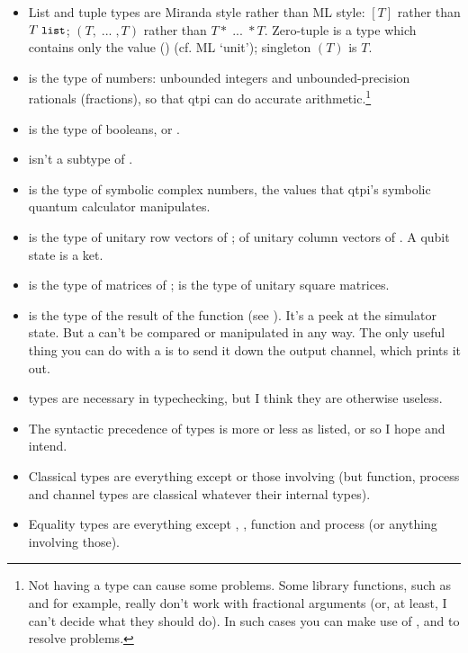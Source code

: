 \begin{itemize}
\item List and tuple types are Miranda style rather than ML style: $[T]$ rather than $T\;\texttt{\small{}list}$; $(T,\;...\;,T)$ rather than $T*\;...\;*T$. Zero-tuple is a type which contains only the value () (cf. ML `unit'); singleton $(T)$ is $T$.
\item {} is the type of numbers: unbounded integers and unbounded-precision rationals (fractions), so that qtpi can do accurate arithmetic.\footnote{Not having a type  can cause some problems. Some library functions, such as  and  for example, really don't work with fractional arguments (or, at least, I can't decide what they should do). In such cases you can make use of ,  and  to resolve problems.}
\item {} is the type of booleans,  or .
\item {} isn't a subtype of .
\item {} is the type of symbolic complex numbers, the values that qtpi's symbolic quantum calculator manipulates.
\item {} is the type of unitary row vectors of ;  of unitary column vectors of . A qubit state is a ket.
\item {}  is the type of matrices of ;  is the type of unitary square matrices.
\item {}  is the type of the result of the   function (see ). It's a peek at the simulator state. But a  can't be compared or manipulated in any way. The only useful thing you can do with a   is to send it down the  output channel, which prints it out.
\item {} types are necessary in typechecking, but I think they are otherwise useless.
\item The syntactic precedence of types is more or less as listed, or so I hope and intend. 
\item Classical types are everything except   or those involving   (but function, process and channel types are classical whatever their internal types).  
\item Equality types are everything except ,  , function and process (or anything involving those).  

\end{itemize}
